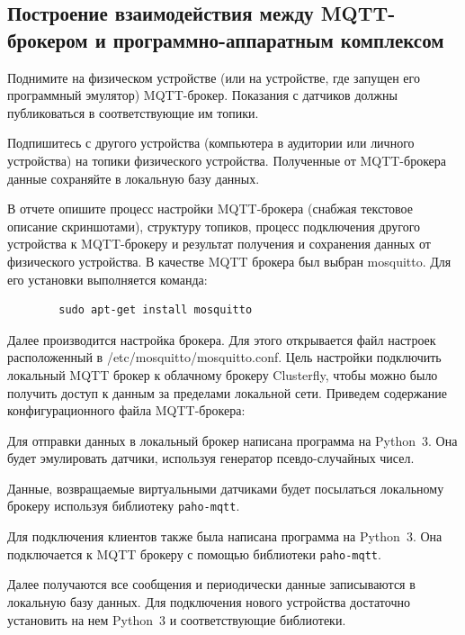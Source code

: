 \documentclass[a4paper,14pt]{extarticle}
\newcommand{\pathToScriptsFolder}{/home/denilai/Documents/repos/latex/scripts}
\begin{document}
\subsection{Построение взаимодействия между MQTT-брокером и программно-аппаратным комплексом}
\begin{problem}
	Поднимите на физическом устройстве (или на устройстве, где запущен его программный
	эмулятор) MQTT-брокер. Показания с датчиков должны публиковаться в соответствующие
	им топики. 
	
	Подпишитесь с другого устройства (компьютера в аудитории или личного устройства) на
	топики физического устройства. Полученные от MQTT-брокера данные сохраняйте в
	локальную базу данных.
	
	В отчете опишите процесс настройки MQTT-брокера (снабжая текстовое описание
	скриншотами), структуру топиков, процесс подключения другого устройства к MQTT-брокеру и результат получения и сохранения данных от физического устройства. 
	\nonum
	В качестве MQTT брокера был выбран mosquitto. Для его установки выполняется команда:
	\begin{lstlisting}
		sudo apt-get install mosquitto
	\end{lstlisting}
	Далее производится настройка брокера. Для этого открывается файл настроек расположенный в /etc/mosquitto/mosquitto.conf. Цель настройки подключить локальный MQTT брокер к облачному брокеру Clusterfly, чтобы можно было получить доступ к данным за пределами локальной сети. 
	Приведем содержание конфигурационного файла MQTT-брокера:
	
	
	Для отправки данных в локальный брокер написана программа на Python~3. Она будет эмулировать датчики, используя генератор псевдо-случайных чисел.
	
	Данные, возвращаемые виртуальными датчиками будет посылаться локальному брокеру используя библиотеку \texttt{paho-mqtt}.
	
	
	Для подключения клиентов также была написана программа на Python~3. Она подключается к MQTT брокеру с помощью библиотеки \texttt{paho-mqtt}. 
	
	
	Далее получаются все сообщения и периодически данные записываются в локальную базу данных. Для подключения нового устройства достаточно установить на нем Python~3 и соответствующие библиотеки.
	

\end{problem}
\end{document}
